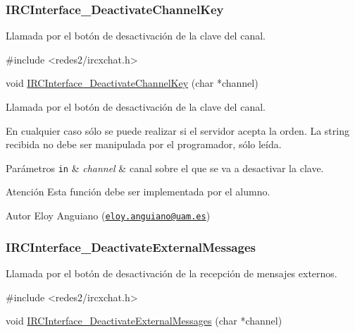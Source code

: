  \hypertarget{IRCInterface_DeactivateChannelKey}{}\subsubsection{I\+R\+C\+Interface\+\_\+\+Deactivate\+Channel\+Key}\label{IRCInterface_DeactivateChannelKey}
Llamada por el botón de desactivación de la clave del canal.


\begin{DoxyCode}
\textcolor{preprocessor}{#include <redes2/ircxchat.h>}

\textcolor{keywordtype}{void} \hyperlink{G-2313-06-P2__client_8c_a3e67ee0cd384b524d57fda14593dce8e}{IRCInterface\_DeactivateChannelKey} (\textcolor{keywordtype}{char} *channel)
\end{DoxyCode}


Llamada por el botón de desactivación de la clave del canal.

En cualquier caso sólo se puede realizar si el servidor acepta la orden. La string recibida no debe ser manipulada por el programador, sólo leída.


\begin{DoxyParams}[1]{Parámetros}
\mbox{\tt in}  & {\em channel} & canal sobre el que se va a desactivar la clave.\\
\hline
\end{DoxyParams}
\begin{DoxyWarning}{Atención}
Esta función debe ser implementada por el alumno.
\end{DoxyWarning}
\begin{DoxyAuthor}{Autor}
Eloy Anguiano (\href{mailto:eloy.anguiano@uam.es}{\tt eloy.\+anguiano@uam.\+es})
\end{DoxyAuthor}


 \hypertarget{IRCInterface_DeactivateExternalMessages}{}\subsubsection{I\+R\+C\+Interface\+\_\+\+Deactivate\+External\+Messages}\label{IRCInterface_DeactivateExternalMessages}
Llamada por el botón de desactivación de la recepción de mensajes externos.


\begin{DoxyCode}
\textcolor{preprocessor}{#include <redes2/ircxchat.h>}

\textcolor{keywordtype}{void} \hyperlink{G-2313-06-P2__client_8c_a638b1535f4ecbc9a6affb2df2a6a946e}{IRCInterface\_DeactivateExternalMessages} (\textcolor{keywordtype}{char} *channel)
\end{DoxyCode}


